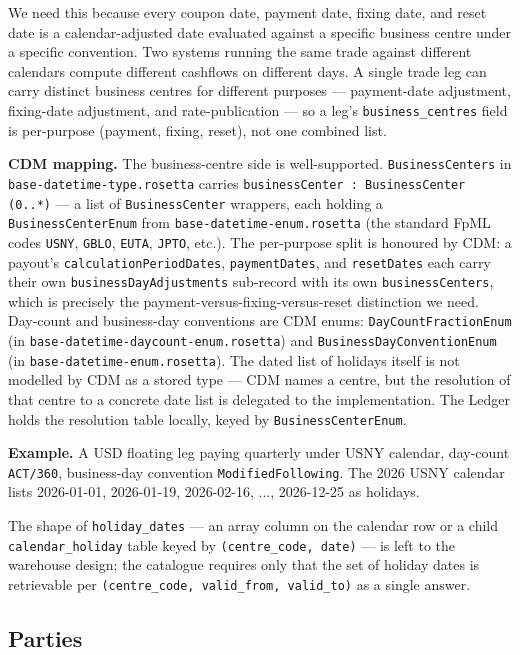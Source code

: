 \documentclass[11pt,a4paper]{article}
\begin{document}
We need this because every coupon date, payment date, fixing date, and reset date is a calendar-adjusted date evaluated against a specific business centre under a specific convention. Two systems running the same trade against different calendars compute different cashflows on different days. A single trade leg can carry distinct business centres for different purposes --- payment-date adjustment, fixing-date adjustment, and rate-publication --- so a leg's \texttt{business\_centres} field is per-purpose (payment, fixing, reset), not one combined list.

\textbf{CDM mapping.} The business-centre side is well-supported. \texttt{BusinessCenters} in \texttt{base-datetime-type.rosetta} carries \texttt{businessCenter : BusinessCenter (0..*)} --- a list of \texttt{BusinessCenter} wrappers, each holding a \texttt{BusinessCenterEnum} from \texttt{base-datetime-enum.rosetta} (the standard FpML codes \texttt{USNY}, \texttt{GBLO}, \texttt{EUTA}, \texttt{JPTO}, etc.). The per-purpose split is honoured by CDM: a payout's \texttt{calculationPeriodDates}, \texttt{paymentDates}, and \texttt{resetDates} each carry their own \texttt{businessDayAdjustments} sub-record with its own \texttt{businessCenters}, which is precisely the payment-versus-fixing-versus-reset distinction we need. Day-count and business-day conventions are CDM enums: \texttt{DayCountFractionEnum} (in \texttt{base-datetime-daycount-enum.rosetta}) and \texttt{BusinessDayConventionEnum} (in \texttt{base-datetime-enum.rosetta}). The dated list of holidays itself is not modelled by CDM as a stored type --- CDM names a centre, but the resolution of that centre to a concrete date list is delegated to the implementation. The Ledger holds the resolution table locally, keyed by \texttt{BusinessCenterEnum}.

\textbf{Example.} A USD floating leg paying quarterly under USNY calendar, day-count \texttt{ACT/360}, business-day convention \texttt{ModifiedFollowing}. The 2026 USNY calendar lists 2026-01-01, 2026-01-19, 2026-02-16, ..., 2026-12-25 as holidays.

The shape of \texttt{holiday\_dates} --- an array column on the calendar row or a child \texttt{calendar\_holiday} table keyed by \texttt{(centre\_code, date)} --- is left to the warehouse design; the catalogue requires only that the set of holiday dates is retrievable per \texttt{(centre\_code, valid\_from, valid\_to)} as a single answer.

\subsection{Parties}
\end{document}
